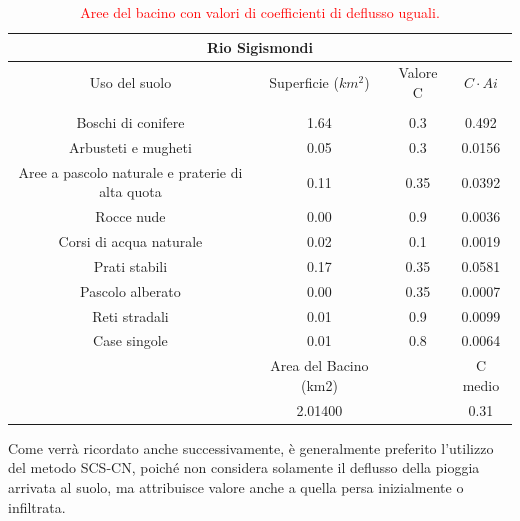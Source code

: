 \begin{table}[H] \centering
    \caption{\textcolor{red}{Aree del bacino con valori di coefficienti di deflusso uguali.}}
    \begin{tabular}{cccc}
    \toprule
    \multicolumn{4}{c}{\textbf{Rio Sigismondi}}\\
    \midrule
    Uso del suolo & Superficie ($km^2$)      & Valore C           & $C\cdot Ai$    \\
    & \textbf{}   & \textit{\textbf{}} &         \\
    Boschi di conifere                               & 1.64                  & 0.3                & 0.492   \\
    Arbusteti e mugheti                              & 0.05                  & 0.3                & 0.0156  \\
    Aree a pascolo naturale e praterie di alta quota & 0.11                  & 0.35               & 0.0392  \\
    Rocce nude                                       & 0.00                  & 0.9                & 0.0036  \\
    Corsi di acqua naturale                          & 0.02                  & 0.1                & 0.0019  \\
    Prati stabili                                    & 0.17                  & 0.35               & 0.0581  \\
    Pascolo alberato                                 & 0.00                  & 0.35               & 0.0007  \\
    Reti stradali                                    & 0.01                  & 0.9                & 0.0099  \\
    Case singole                                     & 0.01                  & 0.8                & 0.0064  \\
    \midrule
& Area del Bacino (km2) &  & C medio \\
  & 2.01400               &                    & 0.31 \\
  \bottomrule  
    \end{tabular}
    \end{table}

Come verrà ricordato anche successivamente, è generalmente preferito l'utilizzo del metodo SCS-CN, poiché non considera solamente il deflusso della pioggia arrivata al suolo, ma attribuisce valore anche a quella persa inizialmente o infiltrata.    

